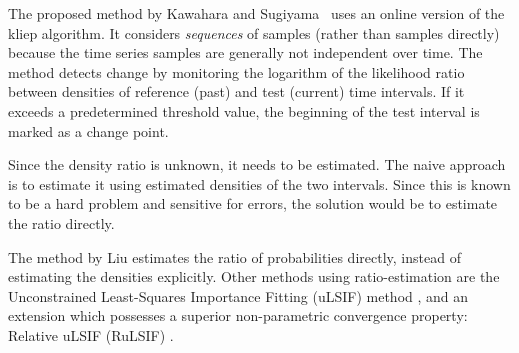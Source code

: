 The proposed method by Kawahara and Sugiyama~\cite{kawahara2009change} uses an online version of the \gls{kliep} algorithm.
It considers \emph{sequences} of samples (rather than samples directly) because the time series samples are generally not independent over time.
The method detects change by monitoring the logarithm of the likelihood ratio between densities of reference (past) and test (current) time intervals.
If it exceeds a predetermined threshold value, the beginning of the test interval is marked as a change point.

Since the density ratio is unknown, it needs to be estimated.
The naive approach is to estimate it using estimated densities of the two intervals.
Since this is known to be a hard problem and sensitive for errors, the solution would be to estimate the ratio directly.

The method by Liu \etal \cite{liu2013change} estimates the ratio of probabilities directly, instead of estimating the densities explicitly.
Other methods using ratio-estimation are the Unconstrained Least-Squares Importance Fitting (uLSIF) method \cite{kanamori2009least}, and an extension which possesses a superior non-parametric convergence property: Relative uLSIF (RuLSIF) \cite{yamada2013relative}.